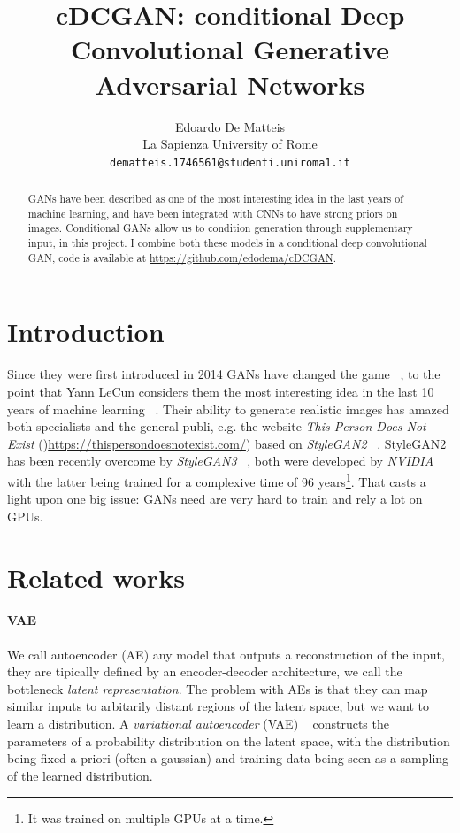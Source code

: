 \documentclass[10pt,twocolumn,letterpaper]{article}
\begin{document}
\title{cDCGAN: conditional Deep Convolutional Generative Adversarial Networks}

\author{Edoardo De Matteis\\
La Sapienza University of Rome\\
{\tt\small dematteis.1746561@studenti.uniroma1.it}
}

\maketitle

\begin{abstract}
   GANs have been described as one of the most interesting idea in the last years of machine learning, and have been integrated with CNNs to have strong priors on images.
   Conditional GANs allow us to condition generation through supplementary input, in this project.
   I combine both these models in a conditional deep convolutional GAN, code is available at \href{https://github.com/edodema/cDCGAN}{https://github.com/edodema/cDCGAN}.
\end{abstract}

\section{Introduction}
Since they were first introduced in 2014 GANs have changed the game ~\cite{goodfellow2014generative}, to the point that Yann LeCun considers them the most interesting idea in the last 10 years of machine learning ~\cite{lecun2016riseminar}.
Their ability to generate realistic images has amazed both specialists and the general publi, e.g. the website \textit{This Person Does Not Exist} ()\href{https://thispersondoesnotexist.com/}{https://thispersondoesnotexist.com/}) based on \textit{StyleGAN2} ~\cite{viazovetskyi2020stylegan2}.
StyleGAN2 has been recently overcome by \textit{StyleGAN3} ~\cite{DBLP:journals/corr/abs-2106-12423}, both were developed by \textit{NVIDIA} with the latter being trained for a complexive time of 96 years\footnote{It was trained on multiple GPUs at a time.}.
That casts a light upon one big issue: GANs need are very hard to train and rely a lot on GPUs.


\section{Related works}
\paragraph{VAE} We call autoencoder (AE) any model that outputs a reconstruction of the input, they are tipically defined by an encoder-decoder architecture, we call the bottleneck \textit{latent representation}.
The problem with AEs is that they can map similar inputs to arbitarily distant regions of the latent space, but we want to learn a distribution.
A \textit{variational autoencoder} (VAE) ~\cite{kingma2013auto} constructs the parameters of a probability distribution on the latent space, with the distribution being fixed a priori (often a gaussian) and training data being seen as a sampling of the learned distribution.
\end{document}
